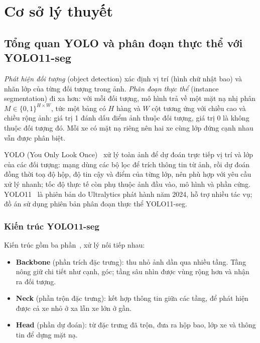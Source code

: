 \chapter{Cơ sở lý thuyết}
\label{chap:theory}

\section{Tổng quan YOLO và phân đoạn thực thể với YOLO11-seg}
\label{sec:yolo}

\emph{Phát hiện đối tượng} (object detection) xác định vị trí (hình chữ nhật bao) và nhãn lớp của từng đối tượng trong ảnh.
\emph{Phân đoạn thực thể} (instance segmentation) đi xa hơn: với mỗi đối tượng, mô hình trả về một mặt nạ nhị phân
$M \in \{0, 1\}^{H \times W}$, tức một bảng có $H$ hàng và $W$ cột tương ứng với chiều cao và chiều rộng ảnh: giá trị 1 đánh dấu điểm ảnh thuộc đối tượng, giá trị 0 là không thuộc đối tượng đó. Mỗi xe có mặt nạ riêng nên hai xe cùng lớp đứng cạnh nhau vẫn được phân biệt.

YOLO (You Only Look Once)~\cite{redmon2016yolo} xử lý toàn ảnh để dự đoán trực tiếp vị trí và lớp của các đối tượng:
mạng dùng các bộ lọc để trích thông tin từ ảnh, rồi dự đoán đồng thời toạ độ hộp, độ tin cậy và điểm của từng lớp, nên phù hợp với yêu cầu xử lý nhanh; tốc độ thực tế còn phụ thuộc ảnh đầu vào, mô hình và phần cứng.
YOLO11~\cite{yolo11} là phiên bản do Ultralytics phát hành năm 2024, hỗ trợ nhiều tác vụ; đồ án sử dụng phiên bản phân đoạn thực thể YOLO11-seg.

\subsection{Kiến trúc YOLO11-seg}

Kiến trúc gồm ba phần~\cite{khanam2024yolov11}, xử lý nối tiếp nhau:
\begin{itemize}
  \setlength{\itemsep}{0.35em}
  \item \textbf{Backbone} (phần trích đặc trưng): thu nhỏ ảnh dần qua nhiều tầng. Tầng nông giữ chi tiết như cạnh, góc; tầng sâu nhìn được vùng rộng hơn và nhận ra đối tượng.
  \item \textbf{Neck} (phần trộn đặc trưng): kết hợp thông tin giữa các tầng, để phát hiện được cả xe nhỏ ở xa lẫn xe lớn ở gần.
  \item \textbf{Head} (phần dự đoán): từ đặc trưng đã trộn, đưa ra hộp bao, lớp xe và thông tin để dựng mặt nạ.
\end{itemize}

